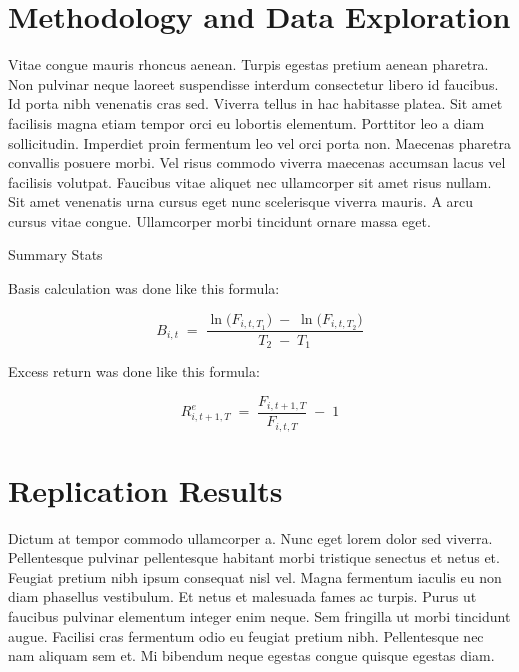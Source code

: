 \documentclass[12pt]{article}
\begin{document}
\newpage

\newpage
\section{Methodology and Data Exploration}

Vitae congue mauris rhoncus aenean. Turpis egestas pretium aenean pharetra.
Non pulvinar neque laoreet suspendisse interdum consectetur libero id
faucibus. Id porta nibh venenatis cras sed. Viverra tellus in hac habitasse
platea. Sit amet facilisis magna etiam tempor orci eu lobortis elementum.
Porttitor leo a diam sollicitudin. Imperdiet proin fermentum leo vel orci
porta non. Maecenas pharetra convallis posuere morbi. Vel risus commodo
viverra maecenas accumsan lacus vel facilisis volutpat. Faucibus vitae
aliquet nec ullamcorper sit amet risus nullam. Sit amet venenatis urna cursus
eget nunc scelerisque viverra mauris. A arcu cursus vitae congue. Ullamcorper
morbi tincidunt ornare massa eget.


\begin{table}[ht!]
    \caption{Summary Stats}
    \centering
    \renewcommand{\arraystretch}{1.2}  %
    \setlength{\tabcolsep}{5pt}        %
    \begin{adjustbox}{max width=\textwidth}
    
    \end{adjustbox}
    \label{table:sector_settlement_summary}
\end{table}

Basis calculation was done like this formula:

\begin{equation}
    B_{i,t} \;=\; \frac{\ln\bigl(F_{i,t,T_1}\bigr)\;-\;\ln\bigl(F_{i,t,T_2}\bigr)}{\,T_2 \;-\; T_1\,}
  \label{eq:basis_formula}
\end{equation}

Excess return was done like this formula:

\begin{equation}
  R^e_{i,t+1,T} \;=\; \frac{F_{i,t+1,T}}{F_{i,t,T}} \;-\; 1
  \label{eq:return_formula}
\end{equation}


\newpage
\section{Replication Results}

Dictum at tempor commodo ullamcorper a. Nunc eget lorem dolor sed
viverra. Pellentesque pulvinar pellentesque habitant morbi tristique senectus
et netus et. Feugiat pretium nibh ipsum consequat nisl vel. Magna fermentum
iaculis eu non diam phasellus vestibulum. Et netus et malesuada fames ac
turpis. Purus ut faucibus pulvinar elementum integer enim neque. Sem
fringilla ut morbi tincidunt augue. Facilisi cras fermentum odio eu feugiat
pretium nibh. Pellentesque nec nam aliquam sem et. Mi bibendum neque egestas
congue quisque egestas diam.
\end{document}

